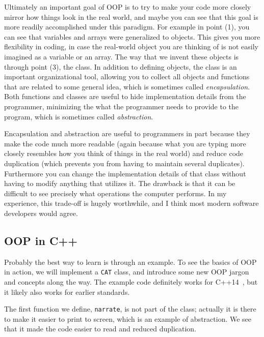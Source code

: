 Ultimately an important goal of OOP is to try to make your code more closely
mirror how things look in the real world, and maybe you can see that this
goal is more readily accomplished under this paradigm.
For example in point (1), you can see that variables
and arrays were generalized to objects. This gives you more flexibility in
coding, in case the real-world object you are thinking of is not easily
imagined as a variable or an array. The way that we invent these objects
is through point (3), the class. In addition to defining objects, the
class is an important organizational tool, allowing you to collect all
objects and functions that are related to some general idea,
which is sometimes called 
{\it encapsulation}. Both functions and classes
are useful to hide implementation details from the programmer, minimizing
the what the programmer needs to provide to the program, which is
sometimes called {\it abstraction}.

Encapsulation and abstraction are useful to programmers in part because
they make the code much more readable (again because what you are typing
more closely resembles how you think of things in the real world) and
reduce code duplication (which prevents you from having to maintain
several duplicates). Furthermore you
can change the implementation details of that class
without having to modify anything that utilizes it. The drawback is that
it can be difficult to see precisely what operations the computer
performs. In my experience, this trade-off is hugely worthwhile, and I think
most modern software developers would agree.


\subsection{OOP in C++} 
Probably the best way to learn is through an example. To see the basics
of OOP in action, we will implement a \texttt{CAT} class, and 
introduce some new OOP jargon and concepts along the way.
The example code definitely works for C++14~\cite{cppDocumentation},
but it likely also works for earlier standards.

The first function we define, \texttt{narrate}, is not part of the class;
actually it is there to make it easier to print to screen, which is
an example of abstraction. We see that it made the code easier to
read and reduced duplication.\\

\begin{code*}
\end{code*}

